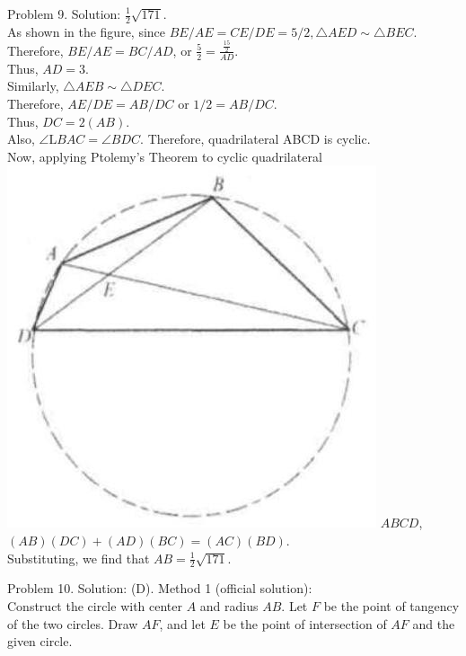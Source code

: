 \documentclass[10pt]{article}
\begin{document}
Problem 9. Solution: \(\frac{1}{2} \sqrt{171}\).\\
As shown in the figure, since \(B E / A E=C E / D E=5 / 2, \triangle A E D \sim \triangle B E C\). Therefore, \(B E / A E=B C / A D\), or \(\frac{5}{2}=\frac{\frac{15}{2}}{A D}\).\\
Thus, \(A D=3\).\\
Similarly, \(\triangle A E B \sim \triangle D E C\).\\
Therefore, \(A E / D E=A B / D C\) or \(1 / 2=A B / D C\).\\
Thus, \(D C=2(A B)\).\\
Also, \(\angle \mathrm{L} B A C=\angle B D C\). Therefore, quadrilateral ABCD is cyclic.\\
Now, applying Ptolemy's Theorem to cyclic quadrilateral\\
\includegraphics[max width=\textwidth]{2025_04_17_97bc1f7e44d93c271a88g-212(1)} \(A B C D\), \((A B)(D C)+(A D)(B C)=(A C)(B D)\).\\
Substituting, we find that \(A B=\frac{1}{2} \sqrt{171}\).

Problem 10. Solution: (D).
Method 1 (official solution):\\
Construct the circle with center \(A\) and radius \(A B\). Let \(F\) be the point of tangency of the two circles. Draw \(A F\), and let \(E\) be the point of intersection of \(A F\) and the given circle.
\end{document}
